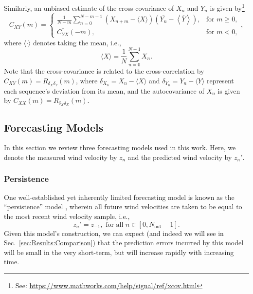 \documentclass[11pt, oneside]{article}
\newcommand{\secref}[1]{Sec.~\ref{#1}}
\begin{document}
Similarly, an unbiased estimate of the cross-covariance of $X_n$ and $Y_n$ is given by\footnote{See: \url{https://www.mathworks.com/help/signal/ref/xcov.html}}
\begin{equation}\label{eq:xcov}
C_{XY}(m) = 
\begin{cases}
\displaystyle \frac{1}{N - m} \sum_{n=0}^{N-m-1} \left( X_{n+m} - \langle X \rangle \right) \left( \overline{Y_n} - \left\langle \overline{Y} \right\rangle \right), & \text{for } m \geq 0,\\[20pt]
\overline{C_{YX}}(-m), & \text{for } m < 0,
\end{cases},
\end{equation}
where $\langle \cdot \rangle$ denotes taking the mean, i.e.,
\begin{equation}
\langle X \rangle = \frac{1}{N} \sum_{n = 0}^{N-1} X_n.
\end{equation}
Note that the cross-covariance is related to the cross-correlation by $C_{XY}(m) = R_{\delta_X \delta_Y}(m)$, where $\delta_{X_n} = X_n - \langle X \rangle$ and $\delta_{Y_n} = Y_n - \langle Y \rangle$ represent each sequence's deviation from its mean, and the autocovariance of $X_n$ is given by $C_{XX}(m) = R_{\delta_X \delta_X}(m)$.

\subsection{Forecasting Models}\label{sec:Models}
In this section we review three forecasting models used in this work.
Here, we denote the measured wind velocity by $z_n$ and the predicted wind velocity by $z_n'$.

\subsubsection{Persistence}
One well-established yet inherently limited forecasting model is known as the ``persistence'' model \citep[Sec.~1.5]{Giebel2011}, wherein all future wind velocities are taken to be equal to the most recent wind velocity sample, i.e.,
\begin{equation}
z_n' = z_{-1}, \text{ for all } n \in [0, N_\text{out} - 1].
\end{equation}
Given this model's construction, we can expect (and indeed we will see in \secref{sec:Results:Comparison}) that the prediction errors incurred by this model will be small in the very short-term, but will increase rapidly with increasing time.
\end{document}
